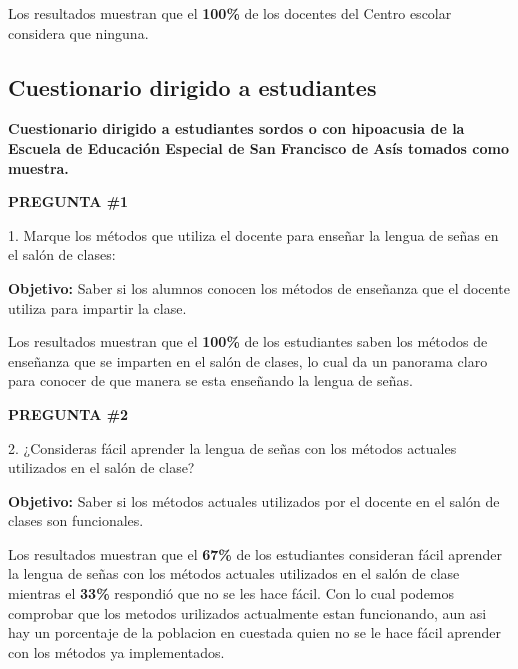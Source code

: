 \documentclass[12pt]{report}%
\begin{document}
Los resultados muestran que el \textbf{ 100\%} de los docentes del Centro escolar considera que ninguna.



\newpage

\subsection{Cuestionario dirigido a estudiantes}
\textbf {Cuestionario dirigido a estudiantes sordos o con hipoacusia de la Escuela de Educación Especial de San Francisco de Asís tomados como muestra.}

\textbf{PREGUNTA \#1}

1. Marque los métodos que utiliza el docente para enseñar la lengua de señas en el salón de clases:

\textbf{Objetivo:} Saber si los alumnos conocen los métodos de enseñanza que el docente utiliza para impartir la clase. 


\begin{center}
\end{center}


Los resultados muestran que el \textbf{ 100\%} de los estudiantes saben los métodos de enseñanza que se imparten en el salón de clases, lo cual da un panorama claro para conocer de que manera se esta enseñando la lengua de señas.


\newpage
\textbf{PREGUNTA \#2}

2. ¿Consideras fácil aprender la lengua de señas con los métodos actuales utilizados en el salón de clase?

\textbf{Objetivo:} Saber si los métodos actuales utilizados por el docente en el salón de clases son funcionales.

\begin{center}
\end{center}


Los resultados muestran que el \textbf{67\%} de los estudiantes consideran fácil aprender la lengua de señas con los métodos actuales utilizados en el salón de clase mientras el \textbf{33\%} respondió que no se les hace fácil. Con lo cual podemos comprobar que los metodos urilizados actualmente estan funcionando, aun asi hay un porcentaje de la poblacion en cuestada quien no se le hace fácil aprender con los métodos ya implementados. 
\end{document}
